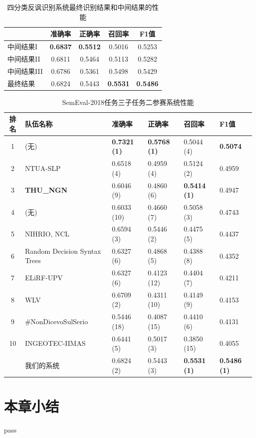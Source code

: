 \begin{table}[htb]
  \centering
  \begin{minipage}[t]{0.8\linewidth}
  \caption{四分类反讽识别系统最终识别结果和中间结果的性能}
  \label{tab:exp_irony_det_B_ensemble_result}
    \begin{tabularx}{\linewidth}{X|cccc}
    \toprule[1.5pt]
    & 准确率 & 正确率 & 召回率 & F1值 \\
    \hline
    中间结果I & \bf 0.6837 & \bf 0.5512 & 0.5016 & 0.5253 \\
    中间结果II & 0.6811 & 0.5464 & 0.5113 & 0.5282 \\
    中间结果III & 0.6786 & 0.5361 & 0.5498 & 0.5429 \\
    \hline
    最终结果 & 0.6824 & 0.5443 & \bf 0.5531 & \bf 0.5486 \\
    \bottomrule[1.5pt]
    \end{tabularx}
  \end{minipage}
\end{table}

\begin{table}[htb]
  \centering
  \begin{minipage}[t]{\linewidth}
  \caption{SemEval-2018任务三子任务二参赛系统性能} %
  \label{tab:exp_irony_det_B_other_comp}
    \begin{tabularx}{\linewidth}{c|X|llll}
    \toprule[1.5pt]
    排名 & 队伍名称 & 准确率 & 正确率 & 召回率 & F1值 \\
    \hline 
    1 & (无) & \bf 0.7321 (1) & \bf 0.5768 (1) & 0.5044 (4) & \bf 0.5074 \\
    2 & NTUA-SLP & 0.6518 (4) & 0.4959 (4) & 0.5124 (2) & 0.4959 \\
    3 & \bf THU\_NGN & 0.6046 (9) & 0.4860 (6) & \bf 0.5414 (1) & 0.4947 \\
    4 & (无) & 0.6033 (10) & 0.4660 (7) & 0.5058 (3) & 0.4743 \\
    5 & NIHRIO, NCL & 0.6594 (3) & 0.5446 (2) & 0.4475 (5) & 0.4437 \\
    6 & Random Decision Syntax Trees & 0.6327 (6) & 0.4868 (5) & 0.4388 (8) & 0.4352 \\
    7 & ELiRF-UPV & 0.6327 (6) & 0.4123 (12) & 0.4404 (7) & 0.4211 \\
    8 & WLV & 0.6709 (2) & 0.4311 (10) & 0.4149 (9) & 0.4153 \\
    9 & \#NonDicevoSulSerio & 0.5446 (18) & 0.4087 (15) & 0.4410 (6) & 0.4131 \\
    10 & INGEOTEC-IIMAS & 0.6441 (5) & 0.5017 (3) & 0.3850 (15) & 0.4055 \\
    \hline
    & 我们的系统 & 0.6824 (2) & 0.5443 (3) & \bf 0.5531 (1) & \bf 0.5486 (1) \\
    \bottomrule[1.5pt]
    \end{tabularx}
  \end{minipage}
\end{table}


\section{本章小结}

pass

